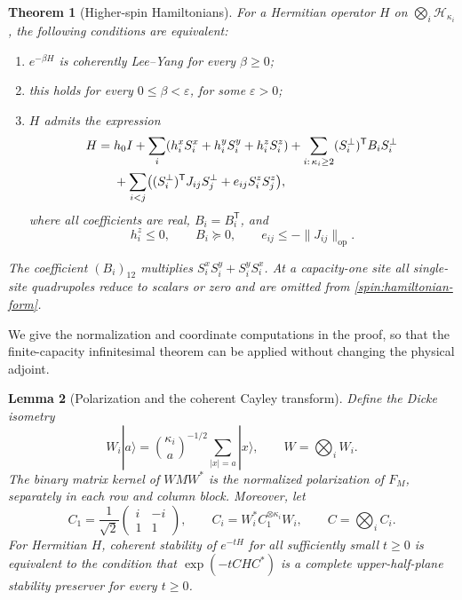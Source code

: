 \documentclass[reqno]{amsart}
\newtheorem{theorem}{Theorem}[section]
\newtheorem{lemma}[theorem]{Lemma}
\theoremstyle{definition}
\theoremstyle{remark}
\begin{document}
\begin{theorem}[Higher-spin Hamiltonians]\label{spin:hamiltonian}
For a Hermitian operator $H$ on $\bigotimes_i\mathcal H_{\kappa_i}$, the
following conditions are equivalent:
\begin{enumerate}
\item $e^{-\beta H}$ is coherently Lee--Yang for every $\beta\geq0$;
\item this holds for every $0\leq\beta<\varepsilon$, for some
      $\varepsilon>0$;
\item $H$ admits the expression
\begin{align}\label{spin:hamiltonian-form}
 H={}&h_0 I+\sum_i(h_i^xS_i^x+h_i^yS_i^y+h_i^zS_i^z)
       +\sum_{i:\,\kappa_i\geq2}(S_i^\perp)^{\mathsf T}B_iS_i^\perp
       \notag\\
    &+\sum_{i<j}\bigl((S_i^\perp)^{\mathsf T}J_{ij}S_j^\perp
                         +e_{ij}S_i^zS_j^z\bigr),
\end{align}
where all coefficients are real, $B_i=B_i^{\mathsf T}$, and
\begin{equation}\label{spin:hamiltonian-cone}
 h_i^z\leq0,\qquad B_i\succeq0,\qquad
 e_{ij}\leq-\|J_{ij}\|_{\mathrm{op}}.
\end{equation}
\end{enumerate}
The coefficient $(B_i)_{12}$ multiplies
$S_i^xS_i^y+S_i^yS_i^x$.  At a capacity-one site all single-site
quadrupoles reduce to scalars or zero and are omitted from
\eqref{spin:hamiltonian-form}.
\end{theorem}

We give the normalization and coordinate computations in the proof, so that
the finite-capacity infinitesimal theorem can be applied without changing
the physical adjoint.

\begin{lemma}[Polarization and the coherent Cayley transform]
\label{spin:cayley}
Define the Dicke isometry
\begin{equation}\label{spin:dicke}
 W_i|a\rangle=\binom{\kappa_i}{a}^{-1/2}
                  \sum_{|x|=a}|x\rangle,\qquad W=\bigotimes_iW_i.
\end{equation}
The binary matrix kernel of $WMW^*$ is the normalized polarization of
$F_M$, separately in each row and column block.  Moreover, let
\begin{equation}\label{spin:cayley-matrix}
 C_1=\frac1{\sqrt2}\begin{pmatrix}i&-i\\1&1\end{pmatrix},\qquad
 C_i=W_i^*C_1^{\otimes\kappa_i}W_i,\qquad C=\bigotimes_iC_i.
\end{equation}
For Hermitian $H$, coherent stability of $e^{-tH}$ for all sufficiently
small $t\geq0$ is equivalent to the condition that
$\exp(-tCHC^*)$ is a complete upper-half-plane stability preserver for
every $t\geq0$.
\end{lemma}
\end{document}
